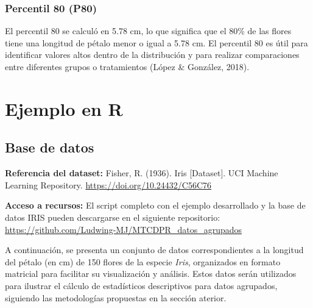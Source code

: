 \documentclass[
  spanish,
  letterpaper,
]{book}
\begin{document}
\subsection{Percentil 80 (P80)}\label{percentil-80-p80}

El percentil 80 se calculó en 5.78 cm, lo que significa que el 80\% de
las flores tiene una longitud de pétalo menor o igual a 5.78 cm. El
percentil 80 es útil para identificar valores altos dentro de la
distribución y para realizar comparaciones entre diferentes grupos o
tratamientos (López \& González, 2018).


\chapter{Ejemplo en R}\label{ejemplo-en-r}

\section{Base de datos}\label{base-de-datos-2}

\textbf{Referencia del dataset:} Fisher, R. (1936). Iris {[}Dataset{]}.
UCI Machine Learning Repository. \url{https://doi.org/10.24432/C56C76}

\textbf{Acceso a recursos:} El script completo con el ejemplo
desarrollado y la base de datos IRIS pueden descargarse en el siguiente
repositorio: \url{https://github.com/Ludwing-MJ/MTCDPR_datos_agrupados}

A continuación, se presenta un conjunto de datos correspondientes a la
longitud del pétalo (en cm) de 150 flores de la especie \emph{Iris},
organizados en formato matricial para facilitar su visualización y
análisis. Estos datos serán utilizados para ilustrar el cálculo de
estadísticos descriptivos para datos agrupados, siguiendo las
metodologías propuestas en la sección aterior.
\end{document}
